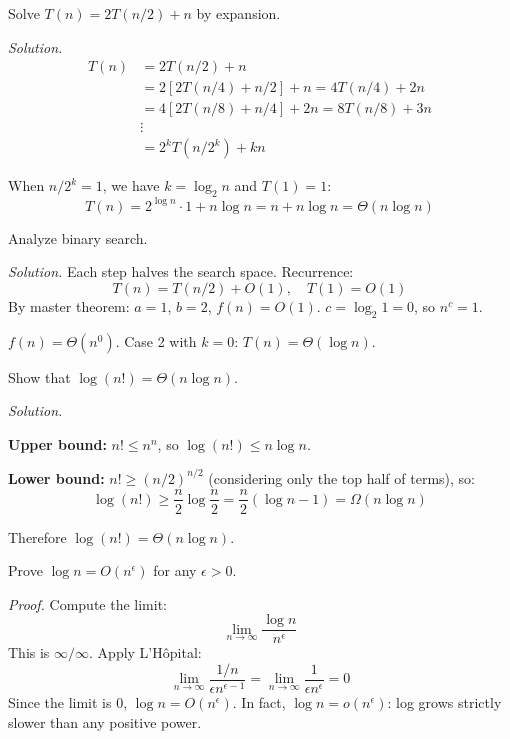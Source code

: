 \begin{example}
Solve $T(n) = 2T(n/2) + n$ by expansion.

\emph{Solution.}
\begin{align*}
T(n) &= 2T(n/2) + n \\
     &= 2[2T(n/4) + n/2] + n = 4T(n/4) + 2n \\
     &= 4[2T(n/8) + n/4] + 2n = 8T(n/8) + 3n \\
     &\vdots \\
     &= 2^k T(n/2^k) + kn
\end{align*}

When $n/2^k = 1$, we have $k = \log_2 n$ and $T(1) = 1$:
\[
T(n) = 2^{\log n} \cdot 1 + n \log n = n + n \log n = \Theta(n \log n)
\]
\end{example}

\begin{example}
Analyze binary search.

\emph{Solution.} Each step halves the search space. Recurrence:
\[
T(n) = T(n/2) + O(1), \quad T(1) = O(1)
\]
By master theorem: $a = 1$, $b = 2$, $f(n) = O(1)$. $c = \log_2 1 = 0$, so $n^c = 1$.

$f(n) = \Theta(n^0)$. Case 2 with $k = 0$: $T(n) = \Theta(\log n)$.
\end{example}

\begin{example}
Show that $\log(n!) = \Theta(n \log n)$.

\emph{Solution.}

\textbf{Upper bound:} $n! \leq n^n$, so $\log(n!) \leq n \log n$.

\textbf{Lower bound:} $n! \geq (n/2)^{n/2}$ (considering only the top half of terms), so:
\[
\log(n!) \geq \frac{n}{2} \log \frac{n}{2} = \frac{n}{2}(\log n - 1) = \Omega(n \log n)
\]

Therefore $\log(n!) = \Theta(n \log n)$.
\end{example}

\begin{example}
Prove $\log n = O(n^\epsilon)$ for any $\epsilon > 0$.

\emph{Proof.} Compute the limit:
\[
\lim_{n \to \infty} \frac{\log n}{n^\epsilon}
\]
This is $\infty/\infty$. Apply L'Hôpital:
\[
\lim_{n \to \infty} \frac{1/n}{\epsilon n^{\epsilon - 1}} = \lim_{n \to \infty} \frac{1}{\epsilon n^\epsilon} = 0
\]
Since the limit is 0, $\log n = O(n^\epsilon)$. In fact, $\log n = o(n^\epsilon)$: log grows strictly slower than any positive power.
\end{example}

